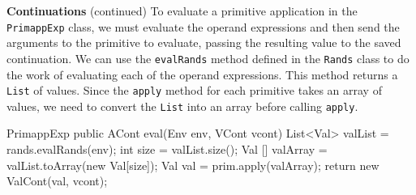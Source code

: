\begin{minipage}[t]{\sw}
\slidenumber
\LARGE
{\bf Continuations} (continued)\exx
To evaluate a primitive application in the \verb'PrimappExp' class,
we must evaluate the operand expressions
and then send the arguments to the primitive to evaluate,
passing the resulting value to the saved continuation.\exx
We can use the \verb'evalRands' method defined
in the \verb'Rands' class to do the work
of evaluating each of the operand expressions.
This method returns a \verb'List' of values.
Since the \verb'apply' method
for each primitive takes an array of values,
we need to convert the \verb'List' into an array
before calling \verb'apply'.
\Large
\begin{qv}
PrimappExp
    public ACont eval(Env env, VCont vcont) {
        List<Val> valList = rands.evalRands(env); 
        int size = valList.size();
        Val [] valArray = valList.toArray(new Val[size]);
        Val val = prim.apply(valArray);
        return new ValCont(val, vcont);
    }
\end{qv}

\end{minipage}
